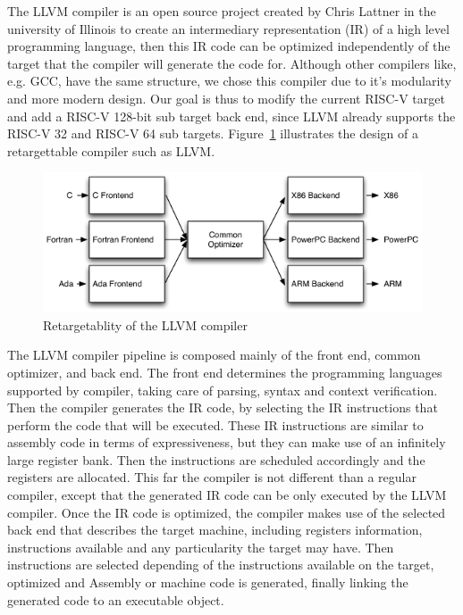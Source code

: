 \documentclass[a4paper,conference]{IEEEtran}
\newcommand{\riscv}{\textsc{\small RISC-V}\xspace}
\begin{document}
The LLVM compiler is an open source project created by Chris Lattner in the university of Illinois to create an intermediary representation (IR) of a high level programming language, then this IR code can be optimized independently of the target that the compiler will generate the code for. Although other compilers like, e.g. GCC, have the same structure, we chose this compiler due to it's modularity and more modern design.
Our goal is thus to modify the current \riscv target and add a \riscv 128-bit sub target back end, since LLVM already supports the \riscv32 and \riscv64 sub targets.
Figure~\ref{fig:RetargetableCompiler} illustrates the design of a retargettable compiler such as LLVM.

\begin{figure}[hbtp]\center\leavevmode
	\includegraphics[width=1\linewidth]{RetargetableCompiler}
	\caption{Retargetablity of the LLVM compiler}
	\label{fig:RetargetableCompiler}
\end{figure}

The LLVM compiler pipeline is composed mainly of the front end, common optimizer, and back end. The front end determines the programming languages supported by compiler, taking care of parsing, syntax and context verification. Then the compiler generates the IR code, by selecting the IR instructions that perform the code that will be executed. These IR instructions are similar to assembly code in terms of expressiveness, but they can make use of an infinitely large register bank. Then the instructions are scheduled accordingly and the registers are allocated. This far the compiler is not different than a regular compiler, except that the generated IR code can be only executed by the LLVM compiler. Once the IR code is optimized, the compiler makes use of the selected back end that describes the target machine, including registers information, instructions available and any particularity the target may have. Then instructions are selected depending of the instructions available on the target, optimized and Assembly or machine code is generated, finally linking the generated code to an executable object. \cite{lattner2011}
\end{document}

